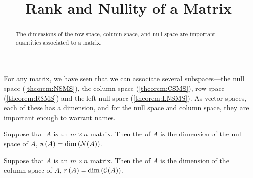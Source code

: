 \documentclass{ximera}
\title{Rank and Nullity of a Matrix}
\begin{document}
\begin{abstract}
  The dimensions of the row space, column space, and null space are
  important quantities associated to a matrix.
\end{abstract}
\maketitle

For any matrix, we have seen that we can associate several
subspaces---the null space (\ref{theorem:NSMS}), the column space
(\ref{theorem:CSMS}), row space (\ref{theorem:RSMS}) and the left null
space (\ref{theorem:LNSMS}).  As vector spaces, each of these has a
dimension, and for the null space and column space, they are important
enough to warrant names.

\begin{definition}
  Suppose that $A$ is an $m\times n$ matrix.  Then the 
  of $A$ is the dimension of the null space of $A$,
  $n\left(A\right)=\dim\left(\mathcal{N}\!\left(A\right)\right)$.
\end{definition}

\begin{definition}
  Suppose that $A$ is an $m\times n$ matrix.  Then the  of
  $A$ is the dimension of the column space of $A$,
  $r\left(A\right)=\dim\left(\mathcal{C}\!\left(A\right)\right)$.
\end{definition}
\end{document}
